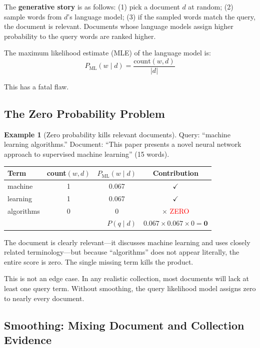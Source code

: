\documentclass[11pt,a4paper]{article}
\theoremstyle{definition}
\newtheorem{example}{Example}[section]
\theoremstyle{plain}
\begin{document}
The \textbf{generative story} is as follows: (1) pick a document $d$ at random; (2) sample words from $d$'s language model; (3) if the sampled words match the query, the document is relevant. Documents whose language models assign higher probability to the query words are ranked higher.

The maximum likelihood estimate (MLE) of the language model is:
\begin{equation}
P_\text{ML}(w \mid d) = \frac{\text{count}(w, d)}{|d|}
\end{equation}

This has a fatal flaw.

\subsection{The Zero Probability Problem}

\begin{example}[Zero probability kills relevant documents]
\label{ex:zero}
Query: ``machine learning algorithms.'' Document: ``This paper presents a novel neural network approach to supervised machine learning'' (15 words).

\begin{center}
\begin{tabular}{lccc}
\toprule
\textbf{Term} & \textbf{count$(w,d)$} & $P_\text{ML}(w \mid d)$ & \textbf{Contribution} \\
\midrule
machine & 1 & 0.067 & $\checkmark$ \\
learning & 1 & 0.067 & $\checkmark$ \\
algorithms & 0 & 0 & $\times$ \textcolor{red}{ZERO} \\
\midrule
\multicolumn{3}{r}{$P(q \mid d)$} & $0.067 \times 0.067 \times 0 = \mathbf{0}$ \\
\bottomrule
\end{tabular}
\end{center}

The document is clearly relevant---it discusses machine learning and uses closely related terminology---but because ``algorithms'' does not appear literally, the entire score is zero. The single missing term kills the product.
\end{example}

This is not an edge case. In any realistic collection, most documents will lack at least one query term. Without smoothing, the query likelihood model assigns zero to nearly every document.

\subsection{Smoothing: Mixing Document and Collection Evidence}
\end{document}
